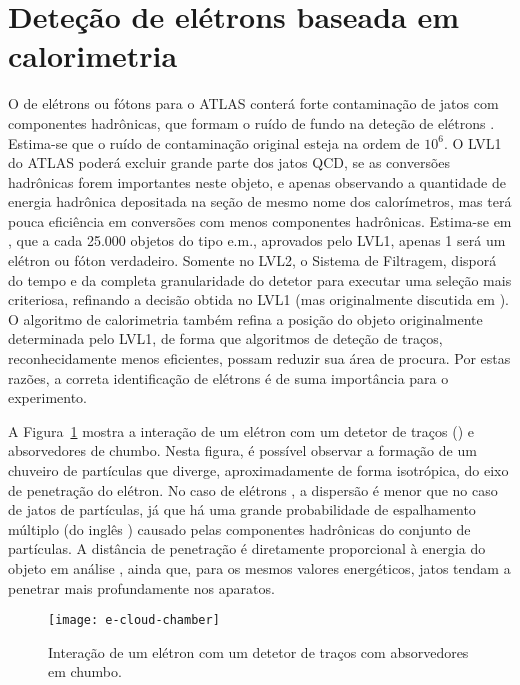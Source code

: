 \section{Deteção de elétrons baseada em calorimetria}
\label{sec:e-detection}

O  de elétrons ou fótons para o ATLAS conterá forte contaminação
de jatos com componentes hadrônicas, que formam o ruído de fundo na deteção de
elétrons \cite{nevski-calor-1992}. Estima-se que o ruído de contaminação
original esteja na ordem de $10^6$. O LVL1 do ATLAS poderá excluir grande
parte dos jatos QCD, se as conversões hadrônicas forem importantes neste
objeto, e apenas observando a quantidade de energia hadrônica depositada na
seção de mesmo nome dos calorímetros, mas terá pouca eficiência em conversões
com menos componentes hadrônicas. Estima-se em
\cite{daqnote00-02}, que a cada 25.000 objetos do tipo e.m., aprovados pelo
LVL1, apenas 1 será um elétron ou fóton verdadeiro. Somente no LVL2, o Sistema
de Filtragem, disporá do tempo e da completa granularidade do detetor para
executar uma seleção mais criteriosa, refinando a decisão obtida no LVL1
\cite{hlt-tdr} (mas originalmente discutida em \cite{ellis-calor-1992}). O
algoritmo de calorimetria também refina a posição do objeto originalmente
determinada pelo LVL1, de forma que algoritmos de deteção de traços,
reconhecidamente menos eficientes, possam reduzir sua área de procura. Por
estas razões, a correta identificação de elétrons é de suma importância para o
experimento.

A Figura~\ref{fig:e-shower} mostra a interação de um elétron com um detetor de
traços () e absorvedores de chumbo. Nesta figura, é
possível observar a formação de um chuveiro de partículas que diverge,
aproximadamente de forma isotrópica, do eixo de penetração do elétron. No caso
de elétrons \cite{wigmans-book}, a dispersão é menor que no caso de jatos de
partículas, já que há uma grande probabilidade de espalhamento múltiplo (do
inglês ) causado pelas componentes hadrônicas do
conjunto de partículas. A distância de penetração é diretamente proporcional à
energia do objeto em análise \cite{leo, knoll}, ainda que, para os mesmos
valores energéticos, jatos tendam a penetrar mais profundamente nos aparatos.

\begin{figure}
\begin{center}
\texttt{[image: e-cloud-chamber]}
\end{center}
\caption{Interação de um elétron com um detetor de traços com absorvedores em
chumbo.} 
\label{fig:e-shower}
\end{figure}

